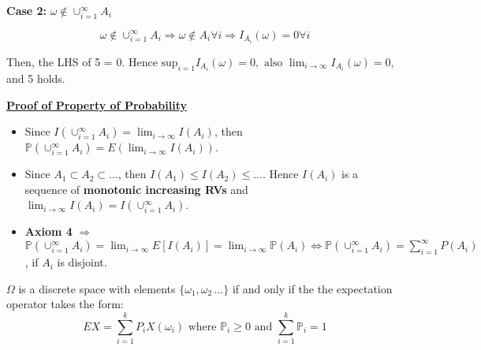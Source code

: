 \textbf{Case 2:} $\omega \notin \cup_{i=1}^{\infty}A_i$

\begin{equation*}
    \omega \notin \cup_{i=1}^{\infty}A_i \Rightarrow \omega \notin A_i \forall i \Rightarrow I_{A_i}(\omega) = 0 \forall i
\end{equation*}

Then, the LHS of 5 = 0. Hence $\text{sup}_{i=1}I_{A_i}(\omega) = 0, \text{ also } \lim_{i\rightarrow\infty} I_{A_i}(\omega) = 0$, and 5 holds.

\underline{\textbf{Proof of Property of Probability}}
\begin{itemize}
    \item Since $I(\cup_{i=1}^\infty A_i) = \lim_{i\rightarrow\infty}I(A_i)$, then $\mathbb{P}(\cup_{i=1}^\infty A_i) = E(\lim_{i\rightarrow\infty}I(A_i))$.
    \item Since $A_1 \subset A_2 \subset ...$, then $I(A_1) \leq I(A_2) \leq ...$. Hence $I(A_i)$ is a sequence of \textbf{monotonic increasing RVs} and $\lim_{i\rightarrow\infty}I(A_i) = I(\cup_{i=1}^\infty A_i)$.
    \item \textbf{Axiom 4} $\Rightarrow$ $\mathbb{P}(\cup_{i=1}^\infty A_i) = \lim_{i\rightarrow\infty}E[I(A_i)] = \lim_{i\rightarrow\infty}\mathbb{P}(A_i) \Longleftrightarrow \mathbb{P}(\cup_{i=1}^\infty A_i) = \sum_{i=1}^{\infty}P(A_i)$, if $A_i$ is disjoint.
\end{itemize}






\begin{thm} $\Omega$ is a discrete space with elements $\{\omega_1, \omega_2\, ...\}$ if and only if the the expectation operator takes the form:
    \begin{equation*}
        EX = \sum_{i=1}^kP_iX(\omega_i) \text{ where } \mathbb{P}_i \geq 0 \text{ and } \sum_{i=1}^k\mathbb{P}_i = 1
    \end{equation*}
\end{thm}



